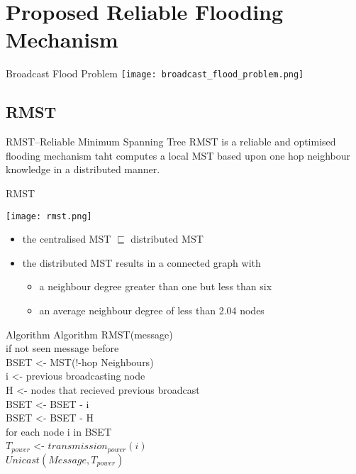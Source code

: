 \documentclass{beamer}
\begin{document}
\section{Proposed Reliable Flooding Mechanism}
\begin{frame}{Broadcast Flood Problem}
\texttt{[image: broadcast\_flood\_problem.png]}
\end{frame}

\subsection{RMST}
\begin{frame}{RMST--Reliable Minimum Spanning Tree}
RMST is a reliable and optimised flooding mechanism taht computes a local MST based upon one hop neighbour knowledge in a distributed manner.
\end{frame}
\begin{frame}{RMST}
        \pause
\begin{center}
    \texttt{[image: rmst.png]}
\end{center}
    \begin{itemize}
        \pause
    \item the centralised MST $\sqsubseteq$ distributed MST 
        \pause
    \item the distributed MST results in a connected graph with 
        \begin{itemize}
        \pause
        \item a neighbour degree greater than one but less than six 
        \pause
        \item an average neighbour degree of less than 2.04 nodes
    \end{itemize}
    \end{itemize}
\end{frame}

\begin{frame}{Algorithm}
Algorithm RMST(message)\\
    \quad if not seen message before\\
            \quad\quad BSET <- MST(!-hop Neighbours)\\
            \quad\quad i <- previous broadcasting node\\
            \quad\quad H <- nodes that recieved previous broadcast\\
            \quad\quad BSET <- BSET - i\\
            \quad\quad BSET <- BSET - H\\
            \quad\quad for each node i in BSET\\
                \quad\quad \quad\quad $T_{power}$ <- $transmission_{power}(i)$\\
                \quad\quad \quad\quad $Unicast(Message, T_{power})$\\

\end{frame}
\end{document}
